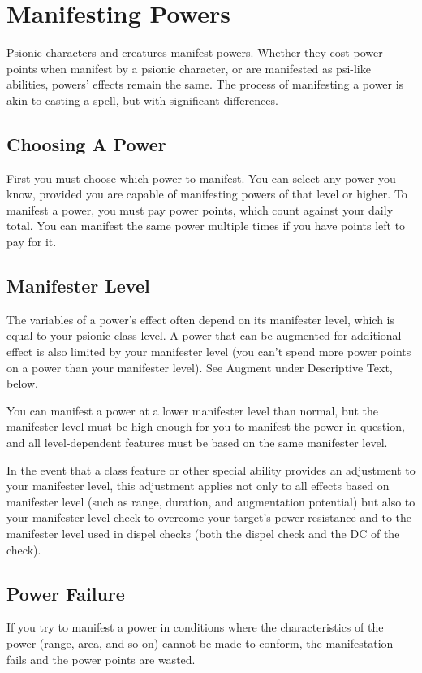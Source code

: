 \section{Manifesting Powers}
Psionic characters and creatures manifest powers. Whether they cost power points when manifest by a psionic character, or are manifested as psi-like abilities, powers' effects remain the same. The process of manifesting a power is akin to casting a spell, but with significant differences.

\subsection{Choosing A Power}
First you must choose which power to manifest. You can select any power you know, provided you are capable of manifesting powers of that level or higher. To manifest a power, you must pay power points, which count against your daily total. You can manifest the same power multiple times if you have points left to pay for it.



\subsection{Manifester Level}
The variables of a power's effect often depend on its manifester level, which is equal to your psionic class level. A power that can be augmented for additional effect is also limited by your manifester level (you can't spend more power points on a power than your manifester level). See Augment under Descriptive Text, below.

You can manifest a power at a lower manifester level than normal, but the manifester level must be high enough for you to manifest the power in question, and all level-dependent features must be based on the same manifester level.

In the event that a class feature or other special ability provides an adjustment to your manifester level, this adjustment applies not only to all effects based on manifester level (such as range, duration, and augmentation potential) but also to your manifester level check to overcome your target's power resistance and to the manifester level used in dispel checks (both the dispel check and the DC of the check).

\subsection{Power Failure}
If you try to manifest a power in conditions where the characteristics of the power (range, area, and so on) cannot be made to conform, the manifestation fails and the power points are wasted.

